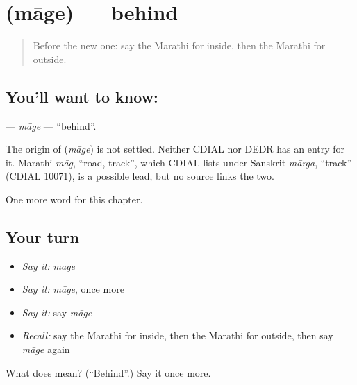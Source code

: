 \section[\texorpdfstring{\mr{मागे} (māge)}{मागे (māge)}]{ (māge) — behind}

\label{lesson:MR-C112-mage}



\begin{quote}
Before the new one: say the Marathi for inside, then the Marathi for outside.
\end{quote}

\subsection*{You'll want to know: }
\textbf{} — \emph{māge} — \textquotedblleft{}behind\textquotedblright{}.

\begin{cousinweb}
The origin of \textbf{} (\emph{māge}) is not settled. Neither CDIAL nor DEDR has an entry for it. Marathi \emph{māg}, \textquotedblleft{}road, track\textquotedblright{}, which CDIAL lists under Sanskrit \emph{mārga}, \textquotedblleft{}track\textquotedblright{} (CDIAL 10071), is a possible lead, but no source links the two.
\end{cousinweb}

\begin{grammarlens}[title={What you've built}]
One more word for this chapter.
\end{grammarlens}

\subsection*{Your turn}
\begin{itemize}
\raggedright
  \item \emph{Say it:} \emph{māge}
  \item \emph{Say it:} \emph{māge}, once more
  \item \emph{Say it:} say \emph{māge}
  \item \emph{Recall:} say the Marathi for inside, then the Marathi for outside, then say \emph{māge} again
\end{itemize}

\begin{tcolorbox}[breakable,colback=teal!4,colframe=teal!35!black,title={Before you move on}]
What does  mean? (\textquotedblleft{}Behind\textquotedblright{}.) Say it once more.
\end{tcolorbox}
